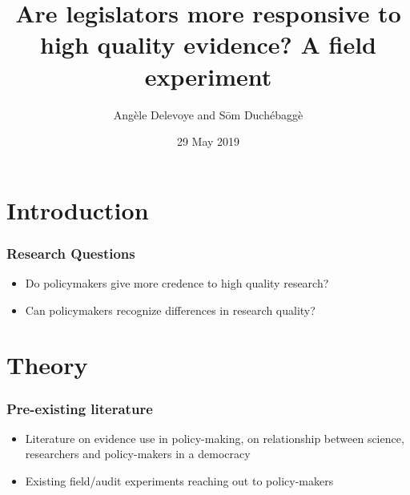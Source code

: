 \documentclass[usenames,dvipsnames]{beamer}
\title{Are legislators more responsive to high quality evidence? A field experiment}
\author{Angèle Delevoye and Sōm Duchébaggè}
\date{29 May 2019}
\begin{document}
\maketitle


\section{Introduction}

\begin{frame}
\frametitle{Research Questions}
\begin{itemize}
\item Do policymakers \textcolor{Cerulean}{give more credence} to high quality research?
\vspace{15mm}
\pause
\item Can policymakers \textcolor{Cerulean}{recognize} differences in research quality?
\end{itemize}
\end{frame}



\section{Theory}

\begin{frame}
\frametitle{Pre-existing literature}

\begin{itemize}
\item Literature on evidence use in policy-making, on relationship between science, researchers and policy-makers in a democracy 
\item Existing field/audit experiments reaching out to policy-makers \hyperlink{existing}{}
\end{itemize}

\end{frame}

\end{document}
